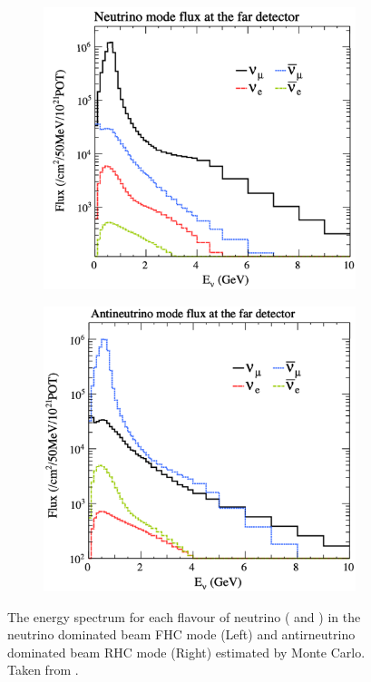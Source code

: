 \begin{figure}[h]
  \begin{subfigure}[t]{0.45\textwidth}
    \includegraphics[width=\textwidth, trim={0mm 0mm 0mm 0mm}, clip,page=1]{Figures/Detectors/T2KFluxInNuMode.pdf}
  \end{subfigure}%
  \begin{subfigure}[t]{0.45\textwidth}
    \includegraphics[width=\textwidth, trim={0mm 0mm 0mm 0mm}, clip,page=1]{Figures/Detectors/T2KFluxInANuMode.pdf}
  \end{subfigure}
  \caption{The energy spectrum for each flavour of neutrino (\quickmath{\nu/\bar{\nu}} and ) in the neutrino dominated beam FHC mode (Left) and antirneutrino dominated beam RHC mode (Right) estimated by Monte Carlo. Taken from \cite{Abe2021-tr}.}
  \label{fig:T2KSKExp_T2K_NuFluxPerMode}
\end{figure}

